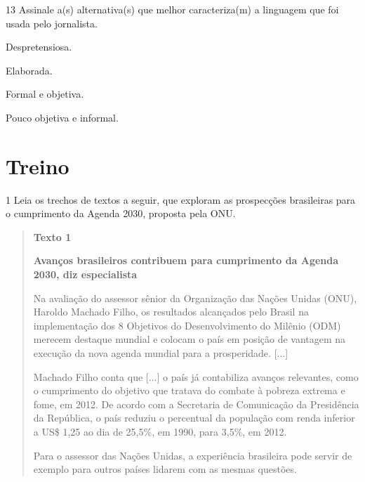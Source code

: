 \num{13} Assinale a(s) alternativa(s) que melhor caracteriza(m) a
linguagem que foi usada pelo jornalista.

\begin{boxlist}
 Despretensiosa.

 Elaborada.

 Formal e objetiva.

 Pouco objetiva e informal.
\end{boxlist}

\section{Treino}

\num{1} Leia os trechos de textos a seguir, que exploram as prospecções
brasileiras para o cumprimento da Agenda 2030, proposta pela ONU.

\begin{quote}
\textbf{Texto 1}


\textbf{Avanços brasileiros contribuem para cumprimento da Agenda 2030,
diz especialista}

Na avaliação do assessor sênior da Organização das Nações Unidas (ONU),
Haroldo Machado Filho, os resultados alcançados pelo Brasil na
implementação dos 8 Objetivos do Desenvolvimento do Milênio (ODM)
merecem destaque mundial e colocam o país em posição de vantagem na
execução da nova agenda mundial para a prosperidade. {[}...{]}

Machado Filho conta que {[}...{]} o país já contabiliza avanços
relevantes, como o cumprimento do objetivo que tratava do combate à
pobreza extrema e fome, em 2012. De acordo com a Secretaria de
Comunicação da Presidência da República, o país reduziu o percentual da
população com renda inferior a US\$ 1,25 ao dia de 25,5\%, em 1990, para
3,5\%, em 2012.

Para o assessor das Nações Unidas, a experiência brasileira pode servir
de exemplo para outros países lidarem com as mesmas questões.

\end{quote}

